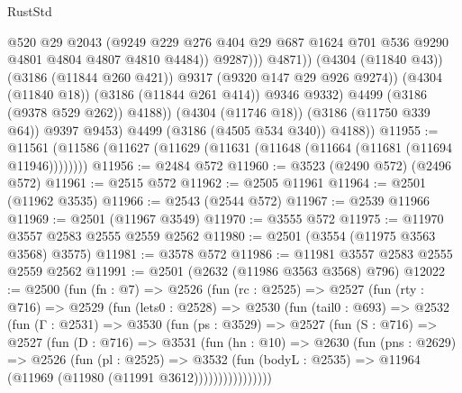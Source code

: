 \begin{lexlean}{RustStd}
\begin{coremodule}
                              @520
                              @29
                              @2043
                              (@9249
                                @229
                                @276
                                @404
                                @29
                                @687
                                @1624
                                @701
                                @536
                                @9290
                                @4801
                                @4804
                                @4807
                                @4810
                                @4484))
                            @9287)))
                      @4871))
                  (@4304 (@11840 @43))
                  (@3186 (@11844 @260 @421))
                  @9317
                  (@9320 @147 @29 @926 @9274))
                (@4304 (@11840 @18))
                (@3186 (@11844 @261 @414))
                @9346
                @9332)
              @4499
              (@3186 (@9378 @529 @262))
              @4188))
          (@4304 (@11746 @18))
          (@3186 (@11750 @339 @64))
          @9397
          @9453)
        @4499
        (@3186 (@4505 @534 @340))
        @4188))
@11955 := @11561 (@11586 (@11627 (@11629 (@11631 (@11648 (@11664 (@11681 (@11694 @11946))))))))
@11956 := @2484 @572
@11960 := @3523 (@2490 @572) (@2496 @572)
@11961 := @2515 @572
@11962 := @2505 @11961
@11964 := @2501 (@11962 @3535)
@11966 := @2543 (@2544 @572)
@11967 := @2539 @11966
@11969 := @2501 (@11967 @3549)
@11970 := @3555 @572
@11975 := @11970 @3557 @2583 @2555 @2559 @2562
@11980 := @2501 (@3554 (@11975 @3563 @3568) @3575)
@11981 := @3578 @572
@11986 := @11981 @3557 @2583 @2555 @2559 @2562
@11991 := @2501 (@2632 (@11986 @3563 @3568) @796)
@12022 := @2500
    (fun (fn : @7) =>
    @2526
      (fun (rc : @2525) =>
      @2527
        (fun (rty : @716) =>
        @2529
          (fun (lets0 : @2528) =>
          @2530
            (fun (tail0 : @693) =>
            @2532
              (fun (Γ : @2531) =>
              @3530
                (fun (ps : @3529) =>
                @2527
                  (fun (S : @716) =>
                  @2527
                    (fun (D : @716) =>
                    @3531
                      (fun (hn : @10) =>
                      @2630
                        (fun (pns : @2629) =>
                        @2526
                          (fun (pl : @2525) =>
                          @3532
                            (fun (bodyL : @2535) =>
                            @11964 (@11969 (@11980 (@11991 @3612))))))))))))))))

\end{coremodule}
\end{lexlean}
